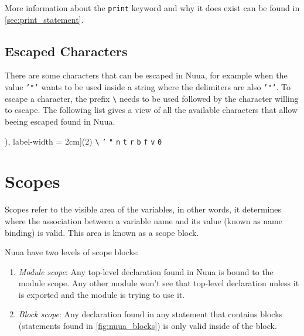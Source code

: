 More information about the \texttt{print} keyword and why it does exist can be found in \autoref{sec:print_statement}.

\subsection{Escaped Characters}
\label{sec:espaced_chars}

There are some characters that can be escaped in Nuua, for example when the value \texttt{'"'} wants to be used inside
a string where the delimiters are also \texttt{'"'}. To escape a character, the prefix \texttt{\textbackslash} needs to be used followed
by the character willing to escape. The following list gives a view of all the available characters that allow beeing escaped found in Nuua.\\

\begin{tasks}[counter-format = (tsk[r]), label-width = 2cm](2)
        \task \texttt{\textbackslash}
        \task \texttt{'}
        \task \texttt{"}
        \task \texttt{n}
        \task \texttt{t}
        \task \texttt{r}
        \task \texttt{b}
        \task \texttt{f}
        \task \texttt{v}
        \task \texttt{0}\\
\end{tasks}

\section{Scopes}
\label{sec:nuua_scopes}

Scopes refer to the visible area of the variables, in other words, it determines where the association between a variable name
and its value (known as name binding) is valid. This area is known as a scope block.

Nuua have two levels of scope blocks:

\begin{enumerate}
    \item \emph{Module scope}: Any top-level declaration found in Nuua is bound to the module scope. Any other module won't see that
        top-level declaration unless it is exported and the module is trying to use it.
    \item \emph{Block scope}: Any declaration found in any statement that contains blocks (statements found in \autoref{fig:nuua_blocks})
        is only valid inside of the block.
\end{enumerate}

